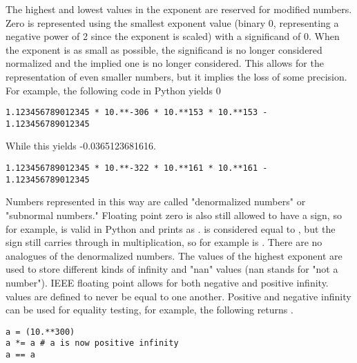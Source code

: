 The highest and lowest values in the exponent are reserved for modified numbers.
Zero is represented using the smallest exponent value (binary 0, representing a negative power of 2 since the exponent is scaled) with a significand of 0.
When the exponent is as small as possible, the significand is no longer considered normalized and the implied one is no longer considered.
This allows for the representation of even smaller numbers, but it implies the loss of some precision.
For example, the following code in Python yields 0
\begin{lstlisting}
1.123456789012345 * 10.**-306 * 10.**153 * 10.**153 - 1.123456789012345
\end{lstlisting}
While this yields -0.0365123681616.
\begin{lstlisting}
1.123456789012345 * 10.**-322 * 10.**161 * 10.**161 - 1.123456789012345
\end{lstlisting}
Numbers represented in this way are called "denormalized numbers" or "subnormal numbers."
Floating point zero is also still allowed to have a sign, so for example,  is valid in Python and prints as .
 is considered equal to , but the sign still carries through in multiplication, so for example  is .
There are no analogues of the denormalized numbers.
The values of the highest exponent are used to store different kinds of infinity and "nan" values (nan stands for "not a number").
IEEE floating point allows for both negative and positive infinity.
 values are defined to never be equal to one another.
Positive and negative infinity can be used for equality testing, for example, the following returns .
\begin{lstlisting}
a = (10.**300)
a *= a # a is now positive infinity
a == a
\end{lstlisting}




